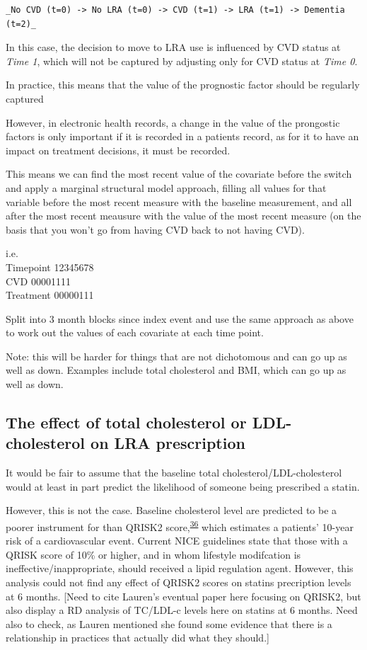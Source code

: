 \documentclass[a4paper, twoside]{templates/ociamthesis}
\begin{document}
\begin{verbatim}
_No CVD (t=0) -> No LRA (t=0) -> CVD (t=1) -> LRA (t=1) -> Dementia (t=2)_
\end{verbatim}

In this case, the decision to move to LRA use is influenced by CVD status at \emph{Time 1}, which will not be captured by adjusting only for CVD status at \emph{Time 0}.

In practice, this means that the value of the prognostic factor should be regularly captured

However, in electronic health records, a change in the value of the prongostic factors is only important if it is recorded in a patients record, as for it to have an impact on treatment decisions, it must be recorded.

This means we can find the most recent value of the covariate before the switch and apply a marginal structural model approach, filling all values for that variable before the most recent measure with the baseline measurement, and all after the most recent meausure with the value of the most recent measure (on the basis that you won't go from having CVD back to not having CVD).

i.e.\\
Timepoint 12345678\\
CVD 00001111\\
Treatment 00000111

Split into 3 month blocks since index event and use the same approach as above to work out the values of each covariate at each time point.

Note: this will be harder for things that are not dichotomous and can go up as well as down. Examples include total cholesterol and BMI, which can go up as well as down.

\hypertarget{the-effect-of-total-cholesterol-or-ldl-cholesterol-on-lra-prescription}{%
\subsection{The effect of total cholesterol or LDL-cholesterol on LRA prescription}\label{the-effect-of-total-cholesterol-or-ldl-cholesterol-on-lra-prescription}}

It would be fair to assume that the baseline total cholesterol/LDL-cholesterol would at least in part predict the likelihood of someone being prescribed a statin.

However, this is not the case. Baseline cholesterol level are predicted to be a poorer instrument for than QRISK2 score,\textsuperscript{\protect\hyperlink{ref-hippisley-cox2008}{36}} which estimates a patients' 10-year risk of a cardiovascular event. Current NICE guidelines state that those with a QRISK score of 10\% or higher, and in whom lifestyle modifcation is ineffective/inappropriate, should received a lipid regulation agent. However, this analysis could not find any effect of QRISK2 scores on statins precription levels at 6 months. {[}Need to cite Lauren's eventual paper here focusing on QRISK2, but also display a RD analysis of TC/LDL-c levels here on statins at 6 months. Need also to check, as Lauren mentioned she found some evidence that there is a relationship in practices that actually did what they should.{]}
\end{document}
